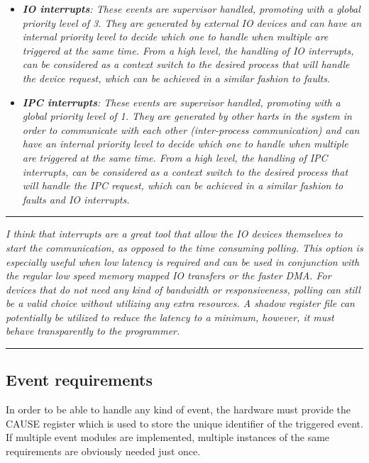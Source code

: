         \begin{itemize}

            \item \textit{\textbf{IO interrupts}: These events are supervisor handled, promoting with a global priority level of 3. They are generated by external IO devices and can have an internal priority level to decide which one to handle when multiple are triggered at the same time. From a high level, the handling of IO interrupts, can be considered as a context switch to the desired process that will handle the device request, which can be achieved in a similar fashion to faults.}

            \item \textit{\textbf{IPC interrupts}: These events are supervisor handled, promoting with a global priority level of 1. They are generated by other harts in the system in order to communicate with each other (inter-process communication) and can have an internal priority level to decide which one to handle when multiple are triggered at the same time. From a high level, the handling of IPC interrupts, can be considered as a context switch to the desired process that will handle the IPC request, which can be achieved in a similar fashion to faults and IO interrupts.}

        \end{itemize}

    \par\noindent\rule{\textwidth}{0.4pt}
    \textit{I think that interrupts are a great tool that allow the IO devices themselves to start the communication, as opposed to the time consuming polling. This option is especially useful when low latency is required and can be used in conjunction with the regular low speed memory mapped IO transfers or the faster DMA. For devices that do not need any kind of bandwidth or responsiveness, polling can still be a valid choice without utilizing any extra resources. A shadow register file can potentially be utilized to reduce the latency to a minimum, however, it must behave transparently to the programmer.}
    \par\noindent\rule{\textwidth}{0.4pt}

    \subsection{Event requirements}

        In order to be able to handle any kind of event, the hardware must provide the CAUSE register which is used to store the unique identifier of the triggered event. If multiple event modules are implemented, multiple instances of the same requirements are obviously needed just once.

